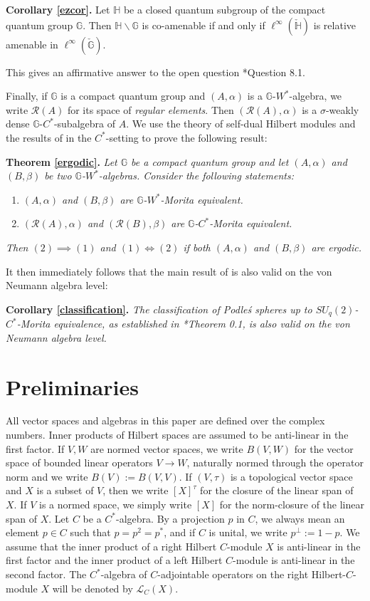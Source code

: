 \documentclass[reqno]{amsart}
\numberwithin{equation}{section}
\newcommand{\G}{\mathbb{G}}
\begin{document}
\textbf{Corollary \ref{ezcor}.}  Let $\mathbb{H}$ be a closed quantum subgroup of the compact quantum group $\G$. Then $\mathbb{H}\backslash \G$ is co-amenable if and only if $\ell^\infty(\check{\mathbb{H}})$ is relative amenable in $\ell^\infty(\check{\G})$.

This gives an affirmative answer to the open question \cite{KKSV22}*{Question 8.1}.

Finally, if $\G$ is a compact quantum group and $(A, \alpha)$ is a $\G$-$W^*$-algebra, we write $\mathcal{R}(A)$ for its space of \emph{regular elements}. Then $(\mathcal{R}(A), \alpha)$ is a $\sigma$-weakly dense $\G$-$C^*$-subalgebra of $A$. We use the theory of self-dual Hilbert modules \cite{Pa73} and the results of \cite{DC12} in the $C^*$-setting to prove the following result:

\textbf{Theorem \ref{ergodic}.}\textit{ Let $\G$ be a compact quantum group and let $(A, \alpha)$ and $(B, \beta)$ be two $\G$-$W^*$-algebras. Consider the following statements:}
    \begin{enumerate}\setlength\itemsep{-0.5em}
        \item \textit{$(A, \alpha)$ and $(B, \beta)$ are $\G$-$W^*$-Morita equivalent.}
        \item \textit{$(\mathcal{R}(A), \alpha)$ and $(\mathcal{R}(B), \beta)$ are $\G$-$C^*$-Morita equivalent.}
    \end{enumerate}
\textit{Then $(2)\implies (1)$ and $(1) \iff (2)$ if both $(A, \alpha)$ and $(B, \beta)$ are ergodic.}

It then immediately follows that the main result of \cite{DC12} is also valid on the von Neumann algebra level:

\textbf{Corollary \ref{classification}.} \textit{The classification of Podleś spheres up to $SU_q(2)$-$C^*$-Morita equivalence, as established in \cite{DC12}*{Theorem 0.1}, is also valid on the von Neumann algebra level. }
    
\section{Preliminaries}

All vector spaces and algebras in this paper are defined over the complex numbers. Inner products of Hilbert spaces are assumed to be anti-linear in the first factor. If $V,W$ are normed vector spaces, we write $B(V,W)$ for the vector space of bounded linear operators $V\to W$, naturally normed through the operator norm and we write $B(V):= B(V,V)$. If $(V, \tau)$ is a topological vector space and $X$ is a subset of $V$, then we write $[X]^\tau$ for the closure of the linear span of $X$. If $V$ is a normed space, we simply write $[X]$ for the norm-closure of the linear span of $X$. 
Let $C$ be a $C^*$-algebra. By a projection $p$ in $C$, we always mean an element $p\in C$ such that $p= p^2 = p^*$, and if $C$ is unital, we write $p^\perp := 1-p$. We assume that the inner product of a right Hilbert $C$-module $X$ is anti-linear in the first factor and the inner product of a left Hilbert $C$-module is anti-linear in the second factor. The $C^*$-algebra of $C$-adjointable operators on the right Hilbert-$C$-module $X$ will be denoted by $\mathscr{L}_C(X)$. 
\end{document}
